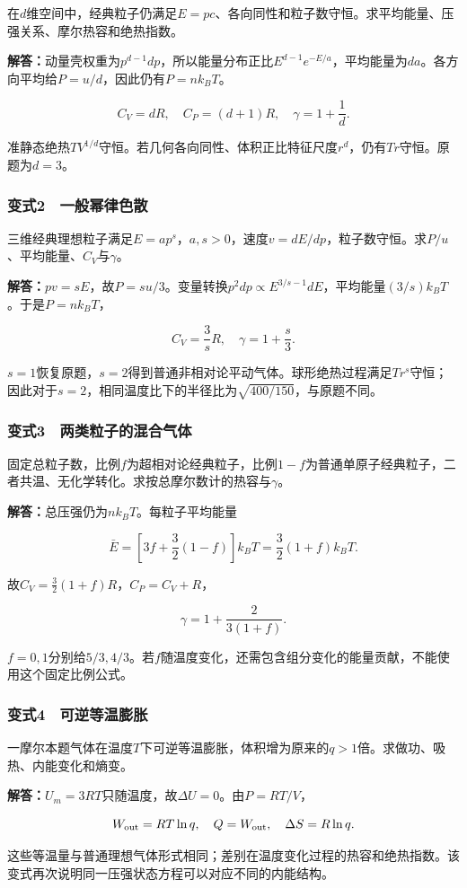\documentclass[12pt,a4paper,fontset=fandol]{ctexart}
\begin{document}
在\(d\)维空间中，经典粒子仍满足\(E=pc\)、各向同性和粒子数守恒。求平均能量、压强关系、摩尔热容和绝热指数。

\textbf{解答：}动量壳权重为\(p^{d-1}dp\)，所以能量分布正比\(E^{d-1}e^{-E/a}\)，平均能量为\(da\)。各方向平均给\(P=u/d\)，因此仍有\(P=nk_BT\)。

\[
C_V=dR,\quad C_P=(d+1)R,\quad\gamma=1+\frac1d.
\]

准静态绝热\(TV^{1/d}\)守恒。若几何各向同性、体积正比特征尺度\(r^d\)，仍有\(Tr\)守恒。原题为\(d=3\)。

\subsubsection{变式2　一般幂律色散}\label{ux53d8ux5f0f2-ux4e00ux822cux5e42ux5f8bux8272ux6563}

三维经典理想粒子满足\(E=ap^s\)，\(a,s>0\)，速度\(v=dE/dp\)，粒子数守恒。求\(P/u\)、平均能量、\(C_V\)与\(\gamma\)。

\textbf{解答：}\(pv=sE\)，故\(P=su/3\)。变量转换\(p^2dp\propto E^{3/s-1}dE\)，平均能量\((3/s)k_BT\)。于是\(P=nk_BT\)，

\[
C_V=\frac3sR,\quad
\gamma=1+\frac s3.
\]

\(s=1\)恢复原题，\(s=2\)得到普通非相对论平动气体。球形绝热过程满足\(Tr^s\)守恒；因此对于\(s=2\)，相同温度比下的半径比为\(\sqrt{400/150}\)，与原题不同。

\subsubsection{变式3　两类粒子的混合气体}\label{ux53d8ux5f0f3-ux4e24ux7c7bux7c92ux5b50ux7684ux6df7ux5408ux6c14ux4f53}

固定总粒子数，比例\(f\)为超相对论经典粒子，比例\(1-f\)为普通单原子经典粒子，二者共温、无化学转化。求按总摩尔数计的热容与\(\gamma\)。

\textbf{解答：}总压强仍为\(n k_BT\)。每粒子平均能量

\[
\bar E=\left[3f+\frac32(1-f)\right]k_BT
=\frac32(1+f)k_BT.
\]

故\(C_V=\frac32(1+f)R\)，\(C_P=C_V+R\)，

\[
\gamma=1+\frac{2}{3(1+f)}.
\]

\(f=0,1\)分别给\(5/3,4/3\)。若\(f\)随温度变化，还需包含组分变化的能量贡献，不能使用这个固定比例公式。

\subsubsection{变式4　可逆等温膨胀}\label{ux53d8ux5f0f4-ux53efux9006ux7b49ux6e29ux81a8ux80c0}

一摩尔本题气体在温度\(T\)下可逆等温膨胀，体积增为原来的\(q>1\)倍。求做功、吸热、内能变化和熵变。

\textbf{解答：}\(U_m=3RT\)只随温度，故\(\Delta U=0\)。由\(P=RT/V\)，

\[
W_{\rm out}=RT\ln q,\quad
Q=W_{\rm out},\quad
\Delta S=R\ln q.
\]

这些等温量与普通理想气体形式相同；差别在温度变化过程的热容和绝热指数。该变式再次说明同一压强状态方程可以对应不同的内能结构。
\end{document}
